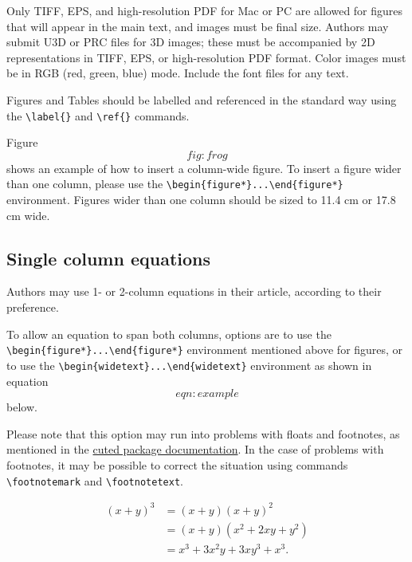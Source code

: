 \documentclass[9pt,twocolumn,twoside,]{pnas-new}
\begin{document}
Only TIFF, EPS, and high-resolution PDF for Mac or PC are allowed for
figures that will appear in the main text, and images must be final
size. Authors may submit U3D or PRC files for 3D images; these must be
accompanied by 2D representations in TIFF, EPS, or high-resolution PDF
format. Color images must be in RGB (red, green, blue) mode. Include the
font files for any text.

Figures and Tables should be labelled and referenced in the standard way
using the \texttt{\textbackslash{}label\{\}} and
\texttt{\textbackslash{}ref\{\}} commands.

Figure \[fig:frog\] shows an example of how to insert a column-wide
figure. To insert a figure wider than one column, please use the
\texttt{\textbackslash{}begin\{figure*\}...\textbackslash{}end\{figure*\}}
environment. Figures wider than one column should be sized to 11.4 cm or
17.8 cm wide.

\hypertarget{single-column-equations}{%
\subsection*{Single column equations}\label{single-column-equations}}

Authors may use 1- or 2-column equations in their article, according to
their preference.

To allow an equation to span both columns, options are to use the
\texttt{\textbackslash{}begin\{figure*\}...\textbackslash{}end\{figure*\}}
environment mentioned above for figures, or to use the
\texttt{\textbackslash{}begin\{widetext\}...\textbackslash{}end\{widetext\}}
environment as shown in equation \[eqn:example\] below.

Please note that this option may run into problems with floats and
footnotes, as mentioned in the \href{http://texdoc.net/pkg/cuted}{cuted
package documentation}. In the case of problems with footnotes, it may
be possible to correct the situation using commands
\texttt{\textbackslash{}footnotemark} and
\texttt{\textbackslash{}footnotetext}.

\[\begin{aligned}
(x+y)^3&=(x+y)(x+y)^2\\
       &=(x+y)(x^2+2xy+y^2) \label{eqn:example} \\
       &=x^3+3x^2y+3xy^3+x^3. 
\end{aligned}\]

\showmatmethods
\showacknow
\pnasbreak



% 
\end{document}
